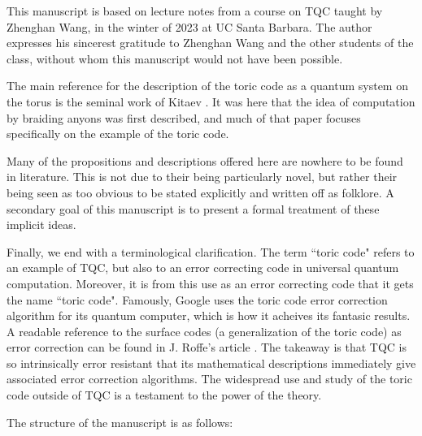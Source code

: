 \documentclass{article}
\theoremstyle{definition}
\numberwithin{figure}{section}
\begin{document}
This manuscript is based on lecture notes from a course on TQC taught by Zhenghan Wang, in the winter of 2023 at UC Santa Barbara. The author expresses his sincerest gratitude to Zhenghan Wang and the other students of the class, without whom this manuscript would not have been possible.

The main reference for the description of the toric code as a quantum system on the torus is the seminal work of Kitaev \cite{kitaev2003fault}. It was here that the idea of computation by braiding anyons was first described, and much of that paper focuses specifically on the example of the toric code.

Many of the propositions and descriptions offered here are nowhere to be found in literature. This is not due to their being particularly novel, but rather their being seen as too obvious to be stated explicitly and written off as folklore. A secondary goal of this manuscript is to present a formal treatment of these implicit ideas.

Finally, we end with a terminological clarification. The term ``toric code" refers to an example of TQC, but also to an error correcting code in universal quantum computation. Moreover, it is from this use as an error correcting code that it gets the name ``toric code". Famously, Google uses the toric code error correction algorithm for its quantum computer, which is how it acheives its fantasic results. A readable reference to the surface codes (a generalization of the toric code) as error correction can be found in J. Roffe's article \cite{roffe2019quantum}. The takeaway is that TQC is so intrinsically error resistant that its mathematical descriptions immediately give associated error correction algorithms. The widespread use and study of the toric code outside of TQC is a testament to the power of the theory.


The structure of the manuscript is as follows:
\end{document}
